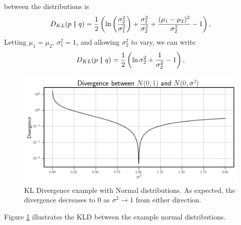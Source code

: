 between the distributions is
\begin{equation}
    D_{KL}(p\ |\!|\ q) = \frac{1}{2}\parens{\ln\parens{\frac{\sigma_2^2}{\sigma_1^2}} + 
    \frac{\sigma_1^2}{\sigma_2^2} + \frac{(\mu_1 - \mu_2)^2}{\sigma_2^2} - 1}, \label{eqn:normal divergence}
\end{equation}
Letting $\mu_1 = \mu_2$, $\sigma_1^2 = 1$, and allowing $\sigma_2^2$ to vary, we can 
write 
\begin{equation}
    D_{KL}(p\ |\!|\ q) = \frac{1}{2}\left(\ln\sigma_2^2 + 
    \frac{1}{\sigma_2^2} - 1\right), \label{eqn:normal divergence2}
\end{equation}
\begin{figure}[ht]
    \centering
    \begin{minipage}{\textwidth}
        \includegraphics[width=\textwidth]{Figures/divergence_example.png}
    \end{minipage} 
    \caption{KL Divergence example with Normal distributions. As expected, the divergence 
    decreases to 0 as $\sigma^2 \to 1$ from either direction.}
    \label{fig:divergence example}
\end{figure}
Figure \ref{fig:divergence example} illustrates the KLD between the example normal distributions.

